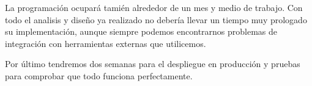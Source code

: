 La programación ocupará tamién alrededor de un mes y medio de trabajo. Con todo el analisis y diseño ya realizado no debería llevar un tiempo muy prologado su implementación, aunque siempre podemos encontrarnos problemas de integración con herramientas externas que utilicemos.

Por último tendremos dos semanas para el despliegue en producción y pruebas para comprobar que todo funciona perfectamente.